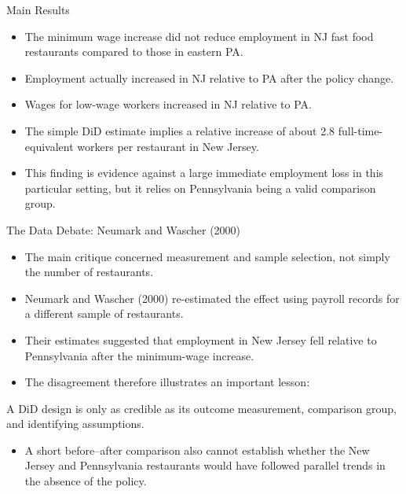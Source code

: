 \documentclass[11pt,aspectratio=169]{beamer}
\begin{document}
\begin{frame}{Main Results}
\begin{itemize}
  \item The minimum wage increase did not reduce employment in NJ fast food restaurants compared to those in eastern PA.
  \item Employment actually increased in NJ relative to PA after the policy change.
  \item Wages for low-wage workers increased in NJ relative to PA.
  \item The simple DiD estimate implies a relative increase of about 2.8 full-time-equivalent workers per restaurant in New Jersey.
  \item This finding is evidence against a large immediate employment loss in this particular setting, but it relies on Pennsylvania being a valid comparison group.
\end{itemize}
\end{frame}

\begin{frame}{The Data Debate: Neumark and Wascher (2000)}
\small
\begin{itemize}
  \item The main critique concerned measurement and sample selection, not simply the number of restaurants.
  \item Neumark and Wascher (2000) re-estimated the effect using payroll records for a different sample of restaurants.
  \item Their estimates suggested that employment in New Jersey fell relative to Pennsylvania after the minimum-wage increase.
  \item The disagreement therefore illustrates an important lesson:
\end{itemize}
\begin{importantbox}[Lesson]
A DiD design is only as credible as its outcome measurement, comparison group, and identifying assumptions.
\end{importantbox}
\begin{itemize}
  \item A short before--after comparison also cannot establish whether the New Jersey and Pennsylvania restaurants would have followed parallel trends in the absence of the policy.
\end{itemize}
\end{frame}
\end{document}
